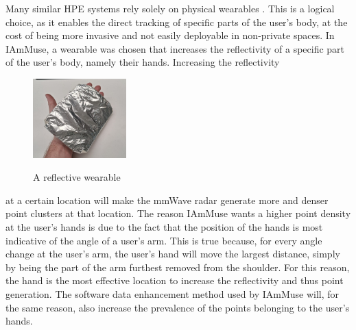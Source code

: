 Many similar HPE systems rely solely on physical wearables \cite{filippeshi2017survey, antonio2010the}. 
This is a logical choice, as it enables the direct tracking of specific parts of the user's body, at the cost of being more invasive and not easily deployable in non-private spaces.
In IAmMuse, a wearable was chosen that increases the reflectivity of a specific part of the user's body, namely their hands. Increasing the reflectivity
\begin{figure}
    \caption{A reflective wearable}
    \centering
    \includegraphics[width=0.32\textwidth]{figures/experimental setup/reflective wearable.png}
    \label{fig: reflective glove wearable}
\end{figure}
 at a certain location will make the mmWave radar generate more and denser point clusters at that location.
The reason IAmMuse wants a higher point density at the user's hands is due to the fact that the position of the hands is most indicative of the angle of a user's arm.
This is true because, for every angle change at the user's arm, the user's hand will move the largest distance, simply by being the part of the arm furthest removed from the shoulder.
For this reason, the hand is the most effective location to increase the reflectivity and thus point generation.
The software data enhancement method used by IAmMuse will, for the same reason, also increase the prevalence of the points belonging to the user's hands.





